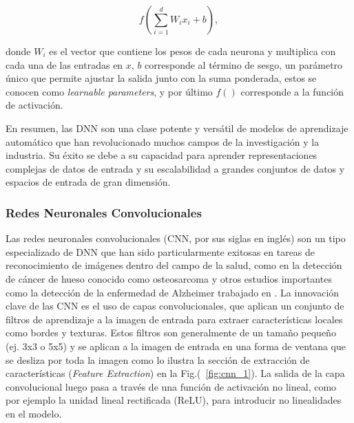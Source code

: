 \documentclass[10pt, oneside, a4paper]{article}
\begin{document}
	\begin{equation} 
		f(\sum_{i = 1}^{d} W_{i} x_{i} + b),
		\label{eq:1}
	\end{equation}


	donde $W_{i}$ es el vector que contiene los pesos de cada neurona y multiplica con cada una de las entradas en $x$, $b$ corresponde al término de sesgo, un parámetro único que permite ajustar la salida junto con la suma ponderada, estos se conocen como \textsl{learnable parameters}, y por último $f()$ corresponde a la función de activación.

	En resumen, las DNN son una clase potente y versátil de modelos de aprendizaje automático que han revolucionado muchos campos de la investigación y la industria. Su éxito se debe a su capacidad para aprender representaciones complejas de datos de entrada y su escalabilidad a grandes conjuntos de datos y espacios de entrada de gran dimensión.

	
	\subsubsection{Redes Neuronales Convolucionales} \label{cnn}
			
	Las redes neuronales convolucionales (CNN, por sus siglas en inglés) son un tipo especializado de DNN que han sido particularmente exitosas en tareas de reconocimiento de imágenes dentro del campo de la salud, como en la detección de cáncer de hueso conocido como osteosarcoma \cite{GAWADE2023100153} y otros estudios importantes como la detección de la enfermedad de Alzheimer trabajado en \cite{DESILVA2023100091}. La innovación clave de las CNN es el uso de capas convolucionales, que aplican un conjunto de filtros de aprendizaje a la imagen de entrada para extraer características locales como bordes y texturas. Estos filtros son generalmente de un tamaño pequeño (ej. 3x3 o 5x5) y se aplican a la imagen de entrada en una forma de ventana que se desliza por toda la imagen como lo ilustra la sección de extracción de características (\textsl{Feature Extraction}) en la Fig.(~\ref{fig:cnn_1}). La salida de la capa convolucional luego pasa a través de una función de activación no lineal, como por ejemplo la unidad lineal rectificada (ReLU), para introducir no linealidades en el modelo. 
	
\end{document}
